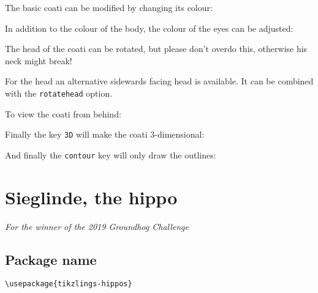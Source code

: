 \documentclass[parskip=half]{scrartcl}
\begin{document}
The basic coati can be modified by changing its colour:
\begin{tcblisting}{}
\coati[body=blue]
\end{tcblisting}

In addition to the colour of the body, the colour of the eyes can be adjusted:
\begin{tcblisting}{}
\coati[eye=red]
\end{tcblisting}

The head of the coati can be rotated, but please don't overdo this, otherwise his neck might break!
\begin{tcblisting}{}
\coati[rotatehead=-15]
\end{tcblisting}

For the head an alternative sidewards facing head is available. It can be combined with the \lstinline|rotatehead| option.
\begin{tcblisting}{}
\coati[sideward]
\end{tcblisting}

To view the coati from behind:
\begin{tcblisting}{}
\coati[back]
\end{tcblisting}

Finally the key \lstinline|3D| will make the coati 3-dimensional:
\begin{tcblisting}{}
\coati[3D]
\end{tcblisting}

And finally the \lstinline|contour| key will only draw the outlines:
\begin{tcblisting}{}
\coati[contour=black]
\end{tcblisting}

%
%
\clearpage
\section[Hippo]{Sieglinde, the hippo}

\emph{For the winner of the 2019 Groundhog Challenge}

\subsection{Package name}

\begin{tcolorbox}[lower separated=false, lefthand width=.8\linewidth]
\vspace*{0.5cm}
\lstinline|\usepackage{tikzlings-hippos}| 
\vspace*{0.5cm}
\end{tcolorbox}
\end{document}
